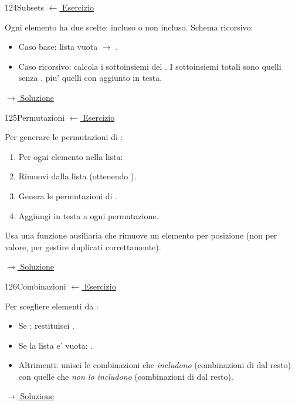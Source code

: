 
\label{hint:124}
\begin{hintbox}{124}{Subsets}
\small\color{black!55}\hyperref[ex:124]{$\leftarrow$ Esercizio}\normalsize\color{black}

Ogni elemento ha due scelte: incluso o non incluso.
Schema ricorsivo:
\begin{itemize}[leftmargin=2em]
  \item Caso base: lista vuota $\to$ .
  \item Caso ricorsivo: calcola i sottoinsiemi del .
        I sottoinsiemi totali sono quelli senza ,
        piu' quelli con  aggiunto in testa.
\end{itemize}

\small\color{black!55}\hyperref[sol:124]{$\rightarrow$ Soluzione}\normalsize\color{black}
\end{hintbox}

\label{hint:125}
\begin{hintbox}{125}{Permutazioni}
\small\color{black!55}\hyperref[ex:125]{$\leftarrow$ Esercizio}\normalsize\color{black}

Per generare le permutazioni di :
\begin{enumerate}[leftmargin=2em]
  \item Per ogni elemento  nella lista:
  \item Rimuovi  dalla lista (ottenendo ).
  \item Genera le permutazioni di .
  \item Aggiungi  in testa a ogni permutazione.
\end{enumerate}
Usa una funzione ausiliaria che rimuove un elemento per posizione
(non per valore, per gestire duplicati correttamente).

\small\color{black!55}\hyperref[sol:125]{$\rightarrow$ Soluzione}\normalsize\color{black}
\end{hintbox}

\label{hint:126}
\begin{hintbox}{126}{Combinazioni}
\small\color{black!55}\hyperref[ex:126]{$\leftarrow$ Esercizio}\normalsize\color{black}

Per scegliere  elementi da :
\begin{itemize}[leftmargin=2em]
  \item Se : restituisci .
  \item Se la lista e' vuota: .
  \item Altrimenti: unisci le combinazioni che \textit{includono}
         (combinazioni di  dal resto)
        con quelle che \textit{non lo includono} (combinazioni
        di  dal resto).
\end{itemize}

\small\color{black!55}\hyperref[sol:126]{$\rightarrow$ Soluzione}\normalsize\color{black}
\end{hintbox}


